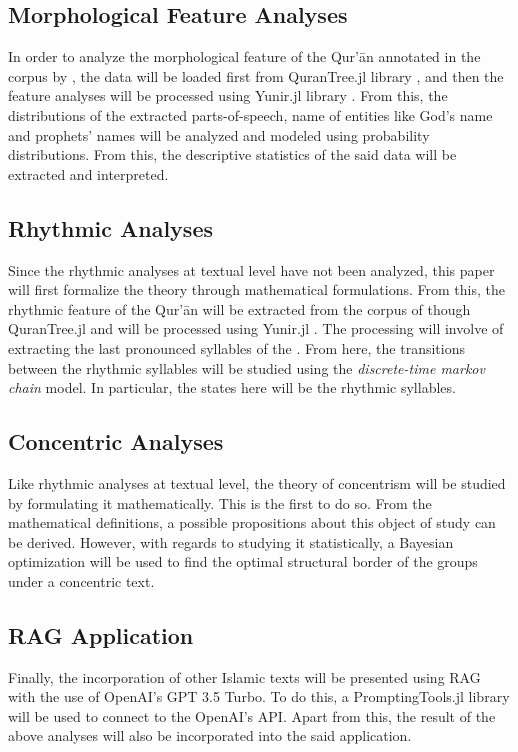 \subsection{Morphological Feature Analyses}
In order to analyze the morphological feature of the Qur'\=an annotated in the corpus by , the data will be loaded first from QuranTree.jl library , and then the feature analyses will be processed using Yunir.jl library . From this, the distributions of the extracted parts-of-speech, name of entities like God's name and prophets' names will be analyzed and modeled using probability distributions. From this, the descriptive statistics of the said data will be extracted and interpreted.
\subsection{Rhythmic Analyses}
Since the rhythmic analyses at textual level have not been analyzed, this paper will first formalize the theory through mathematical formulations. From this, the rhythmic feature of the Qur'\=an will be extracted from the corpus of  though \mbox{QuranTree.jl}  and will be processed using \mbox{Yunir.jl} . The processing will involve of extracting the last pronounced syllables of the  . From here, the transitions between the rhythmic syllables will be studied using the \textit{discrete-time markov chain} model. In particular, the states here will be the rhythmic syllables.
\subsection{Concentric Analyses}
Like rhythmic analyses at textual level, the theory of concentrism will be studied by formulating it mathematically. This is the first to do so. From the mathematical definitions, a possible propositions about this object of study can be derived. However, with regards to studying it statistically, a Bayesian optimization will be used to find the optimal structural border of the groups under a concentric text.
\subsection{RAG Application}
Finally, the incorporation of other Islamic texts will be presented using RAG with the use of OpenAI's GPT 3.5 Turbo. To do this, a PromptingTools.jl library will be used to connect to the OpenAI's API. Apart from this, the result of the above analyses will also be incorporated into the said application. 